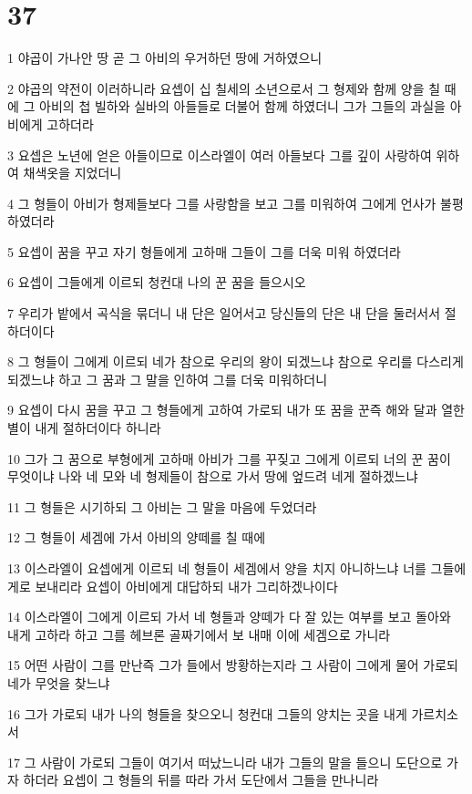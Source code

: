\chapter{37}

\par 1 야곱이 가나안 땅 곧 그 아비의 우거하던 땅에 거하였으니
\par 2 야곱의 약전이 이러하니라 요셉이 십 칠세의 소년으로서 그 형제와 함께 양을 칠 때에 그 아비의 첩 빌하와 실바의 아들들로 더불어 함께 하였더니 그가 그들의 과실을 아비에게 고하더라
\par 3 요셉은 노년에 얻은 아들이므로 이스라엘이 여러 아들보다 그를 깊이 사랑하여 위하여 채색옷을 지었더니
\par 4 그 형들이 아비가 형제들보다 그를 사랑함을 보고 그를 미워하여 그에게 언사가 불평하였더라
\par 5 요셉이 꿈을 꾸고 자기 형들에게 고하매 그들이 그를 더욱 미워 하였더라
\par 6 요셉이 그들에게 이르되 청컨대 나의 꾼 꿈을 들으시오
\par 7 우리가 밭에서 곡식을 묶더니 내 단은 일어서고 당신들의 단은 내 단을 둘러서서 절하더이다
\par 8 그 형들이 그에게 이르되 네가 참으로 우리의 왕이 되겠느냐 참으로 우리를 다스리게 되겠느냐 하고 그 꿈과 그 말을 인하여 그를 더욱 미워하더니
\par 9 요셉이 다시 꿈을 꾸고 그 형들에게 고하여 가로되 내가 또 꿈을 꾼즉 해와 달과 열한 별이 내게 절하더이다 하니라
\par 10 그가 그 꿈으로 부형에게 고하매 아비가 그를 꾸짖고 그에게 이르되 너의 꾼 꿈이 무엇이냐 나와 네 모와 네 형제들이 참으로 가서 땅에 엎드려 네게 절하겠느냐
\par 11 그 형들은 시기하되 그 아비는 그 말을 마음에 두었더라
\par 12 그 형들이 세겜에 가서 아비의 양떼를 칠 때에
\par 13 이스라엘이 요셉에게 이르되 네 형들이 세겜에서 양을 치지 아니하느냐 너를 그들에게로 보내리라 요셉이 아비에게 대답하되 내가 그리하겠나이다
\par 14 이스라엘이 그에게 이르되 가서 네 형들과 양떼가 다 잘 있는 여부를 보고 돌아와 내게 고하라 하고 그를 헤브론 골짜기에서 보 내매 이에 세겜으로 가니라
\par 15 어떤 사람이 그를 만난즉 그가 들에서 방황하는지라 그 사람이 그에게 물어 가로되 네가 무엇을 찾느냐
\par 16 그가 가로되 내가 나의 형들을 찾으오니 청컨대 그들의 양치는 곳을 내게 가르치소서
\par 17 그 사람이 가로되 그들이 여기서 떠났느니라 내가 그들의 말을 들으니 도단으로 가자 하더라 요셉이 그 형들의 뒤를 따라 가서 도단에서 그들을 만나니라
